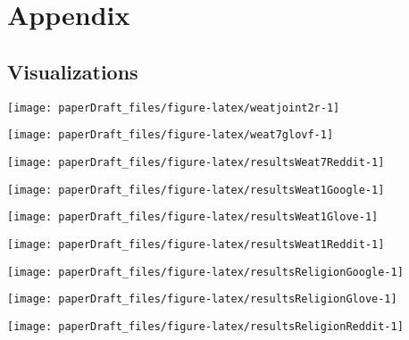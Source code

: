 \documentclass[
  12pt,
  dvipsnames,enabledeprecatedfontcommands]{scrartcl}
\begin{document}
\hypertarget{appendix}{%
\section{Appendix}\label{appendix}}

\hypertarget{visualizations}{%
\subsection{Visualizations}\label{visualizations}}

\label{appendix:visualizations}

\begin{center}\texttt{[image: paperDraft\_files/figure-latex/weatjoint2r-1]} \end{center}

\pagebreak

\begin{center}\texttt{[image: paperDraft\_files/figure-latex/weat7glovf-1]} \end{center}

\begin{center}\texttt{[image: paperDraft\_files/figure-latex/resultsWeat7Reddit-1]} \end{center}

\begin{center}\texttt{[image: paperDraft\_files/figure-latex/resultsWeat1Google-1]} \end{center}

\begin{center}\texttt{[image: paperDraft\_files/figure-latex/resultsWeat1Glove-1]} \end{center}

\begin{center}\texttt{[image: paperDraft\_files/figure-latex/resultsWeat1Reddit-1]} \end{center}

\begin{center}\texttt{[image: paperDraft\_files/figure-latex/resultsReligionGoogle-1]} \end{center}

\begin{center}\texttt{[image: paperDraft\_files/figure-latex/resultsReligionGlove-1]} \end{center}

\begin{center}\texttt{[image: paperDraft\_files/figure-latex/resultsReligionReddit-1]} \end{center}
\end{document}
